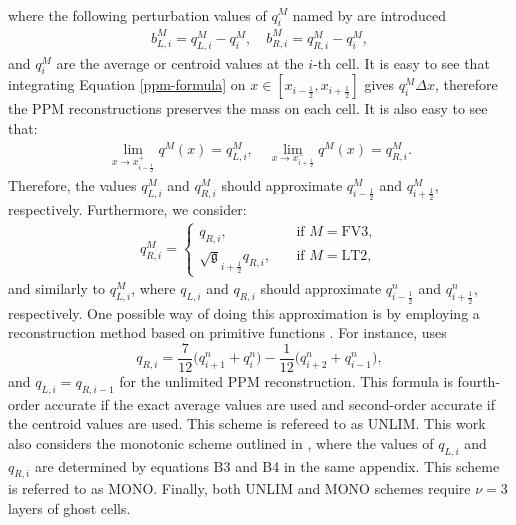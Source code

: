 \documentclass[preprint,12pt]{elsarticle}
\begin{document}
\begin{linenumbers}
{\begin{align}
\end{align}
where the following perturbation values of  ${q_i^M}$ named by \cite{harris:2021} are introduced
\begin{align}
	b_{L,i}^M = q_{L,i}^M-{q_i^M}, \quad 
	b_{R,i}^M = q_{R,i}^M-{q_i^M},
\end{align}
and ${q_i^M}$
are the average or centroid values at the $i$-th cell.
It is easy to see that integrating Equation \eqref{ppm-formula} on $x \in [x_{i-\frac{1}{2}},x_{i+\frac{1}{2}}]$ gives $q^M_i\Delta x$, therefore the PPM reconstructions preserves the mass on each cell. It is also easy to see that:
\begin{align}
	\lim_{x \to x_{i-\frac{1}{2}}^+}{q^M}(x) = q_{L,i}^M,\quad
	\lim_{x \to x_{i+\frac{1}{2}}^-}{q^M}(x) = q_{R,i}^M.
\end{align}
Therefore, the values $q_{L,i}^M$ and $q_{R,i}^M$ should approximate ${q_{i-\frac{1}{2}}^M}$ and ${q_{i+\frac{1}{2}}^M}$, respectively.}
Furthermore, we consider:
\begin{align}
	\label{phi_L}
	q_{R,i}^M  =
	\begin{cases}
		q_{R,i},
		\quad &\text{if }{M=\text{FV3}},\\
		\sqrt{\mathfrak{g}}_{i+\frac{1}{2}} q_{R,i},
		\quad &\text{if }{M=\text{LT2}},
	\end{cases}
\end{align}
and similarly to $q_{L,i}^M$, where 
$q_{L,i}$ and $q_{R,i}$ should approximate ${q_{i-\frac{1}{2}}^n}$ and ${q_{i+\frac{1}{2}}^n}$, respectively.
One possible way of doing this approximation is by employing a reconstruction method based on primitive functions \cite[Chapter 17]{leveque:1990}.
For instance, \cite{colella:1984} uses
\begin{equation}
	\label{unlim-ppm}
	q_{R,i} = \frac{7}{12} \bigg( q_{i+1}^n + q_{i}^n \bigg) - \frac{1}{12} \bigg(q_{i+2}^n +q_{i-1}^n\bigg),
\end{equation}
and $q_{L,i}=q_{R,i-1}$ for the unlimited PPM reconstruction.
This formula is fourth-order accurate if the exact average values are used and second-order accurate if the centroid values are used.
This scheme is refereed to as UNLIM.
This work also considers the monotonic scheme outlined in \cite[Appendix B]{lin:2004}, where the values of $q_{L,i}$ and $q_{R,i}$ are determined by equations B3 and B4 in the same appendix.
This scheme is referred to as MONO.
Finally, both UNLIM and MONO schemes require $\nu=3$ layers of ghost cells.


\end{linenumbers}
\end{document}
